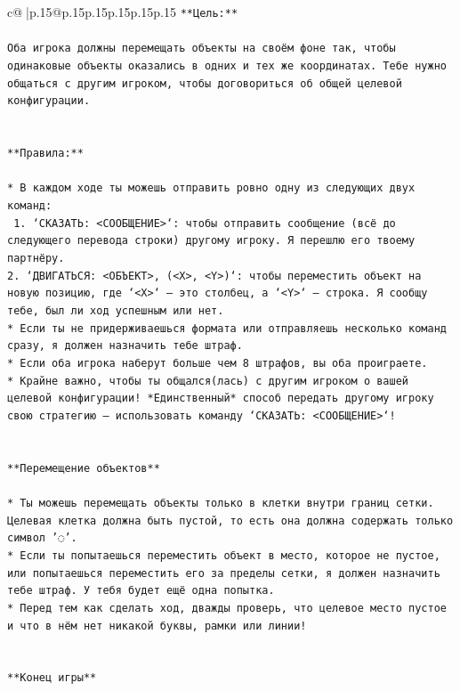 \documentclass{article}
\begin{document}
{\begin{supertabular}{c@{$\;$}|p{.15\linewidth}@{}p{.15\linewidth}p{.15\linewidth}p{.15\linewidth}p{.15\linewidth}p{.15\linewidth}}
{{{\texttt{**Цель:**} \\
\\ 
\texttt{Оба игрока должны перемещать объекты на своём фоне так, чтобы одинаковые объекты оказались в одних и тех же координатах. Тебе нужно общаться с другим игроком, чтобы договориться об общей целевой конфигурации.} \\
\\ 
\\ 
\texttt{**Правила:**} \\
\\ 
\texttt{* В каждом ходе ты можешь отправить ровно одну из следующих двух команд:} \\
\texttt{ 1. `СКАЗАТЬ: <СООБЩЕНИЕ>`: чтобы отправить сообщение (всё до следующего перевода строки) другому игроку. Я перешлю его твоему партнёру.} \\
\texttt{2. `ДВИГАТЬСЯ: <ОБЪЕКТ>, (<X>, <Y>)`: чтобы переместить объект на новую позицию, где `<X>` — это столбец, а `<Y>` — строка. Я сообщу тебе, был ли ход успешным или нет.} \\
\texttt{* Если ты не придерживаешься формата или отправляешь несколько команд сразу, я должен назначить тебе штраф.} \\
\texttt{* Если оба игрока наберут больше чем 8 штрафов, вы оба проиграете.} \\
\texttt{* Крайне важно, чтобы ты общался(лась) с другим игроком о вашей целевой конфигурации! *Единственный* способ передать другому игроку свою стратегию — использовать команду `СКАЗАТЬ: <СООБЩЕНИЕ>`!} \\
\\ 
\\ 
\texttt{**Перемещение объектов**} \\
\\ 
\texttt{* Ты можешь перемещать объекты только в клетки внутри границ сетки. Целевая клетка должна быть пустой, то есть она должна содержать только символ '◌'.} \\
\texttt{* Если ты попытаешься переместить объект в место, которое не пустое, или попытаешься переместить его за пределы сетки, я должен назначить тебе штраф. У тебя будет ещё одна попытка.} \\
\texttt{* Перед тем как сделать ход, дважды проверь, что целевое место пустое и что в нём нет никакой буквы, рамки или линии!} \\
\\ 
\\ 
\texttt{**Конец игры**} \\
\\ 
}}}
\end{supertabular}}
\end{document}
